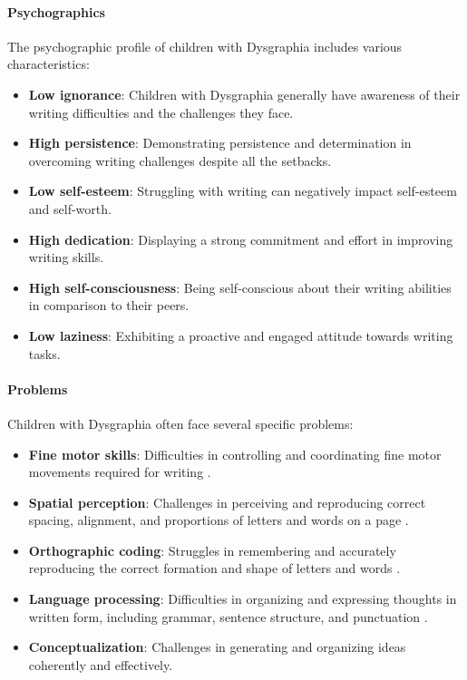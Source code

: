 \paragraph{Psychographics}
The psychographic profile of children with Dysgraphia includes various characteristics:
\begin{itemize}
    \item \textbf{Low ignorance}: Children with Dysgraphia generally have awareness of their writing difficulties and the challenges they face.
    \item \textbf{High persistence}: Demonstrating persistence and determination in overcoming writing challenges despite all the setbacks.
    \item \textbf{Low self-esteem}: Struggling with writing can negatively impact self-esteem and self-worth.
    \item \textbf{High dedication}: Displaying a strong commitment and effort in improving writing skills.
    \item \textbf{High self-consciousness}: Being self-conscious about their writing abilities in comparison to their peers.
    \item \textbf{Low laziness}: Exhibiting a proactive and engaged attitude towards writing tasks.
\end{itemize}

\paragraph{Problems}
Children with Dysgraphia often face several specific problems:
\begin{itemize}
    \item \textbf{Fine motor skills}: Difficulties in controlling and coordinating fine motor movements required for writing \cite{cleveland_dysgraphia}.
    \item \textbf{Spatial perception}: Challenges in perceiving and reproducing correct spacing, alignment, and proportions of letters and words on a page \cite{understood_accommodations}.
    \item \textbf{Orthographic coding}: Struggles in remembering and accurately reproducing the correct formation and shape of letters and words \cite{pmc_dysgraphia}.
    \item \textbf{Language processing}: Difficulties in organizing and expressing thoughts in written form, including grammar, sentence structure, and punctuation \cite{edutopia_dysgraphia}.
    \item \textbf{Conceptualization}: Challenges in generating and organizing ideas coherently and effectively.
\end{itemize}

